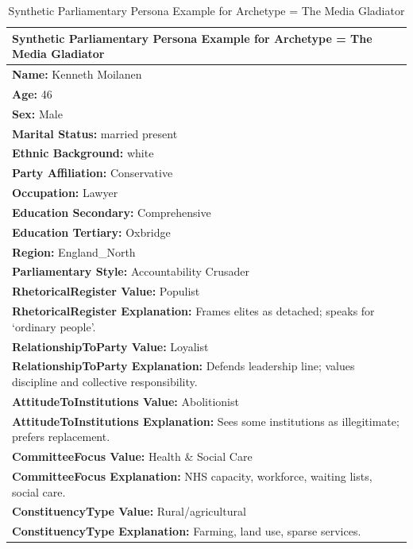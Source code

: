 \documentclass[11pt]{article}
\begin{document}
\begin{table}[ht]
\centering
\caption{Synthetic Parliamentary Persona Example for Archetype = The Media Gladiator}
\label{tab:parliamentry-persona-example-3}
\scriptsize %
\begin{tabularx}{\textwidth}{X}
\toprule
\textbf{Synthetic Parliamentary Persona Example for Archetype = The Media Gladiator} \\
\midrule
\textbf{Name:} Kenneth Moilanen \\
\textbf{Age:} 46 \\
\textbf{Sex:} Male \\
\textbf{Marital Status:} married present \\
\textbf{Ethnic Background:} white \\
\textbf{Party Affiliation:} Conservative \\
\textbf{Occupation:} Lawyer \\
\textbf{Education Secondary:} Comprehensive \\
\textbf{Education Tertiary:} Oxbridge \\
\textbf{Region:} England\_North \\
\textbf{Parliamentary Style:} Accountability Crusader \\[4pt]

\textbf{RhetoricalRegister Value:} Populist \\
\textbf{RhetoricalRegister Explanation:} Frames elites as detached; speaks for ‘ordinary people’. \\[4pt]

\textbf{RelationshipToParty Value:} Loyalist \\
\textbf{RelationshipToParty Explanation:} Defends leadership line; values discipline and collective responsibility. \\[4pt]

\textbf{AttitudeToInstitutions Value:} Abolitionist \\
\textbf{AttitudeToInstitutions Explanation:} Sees some institutions as illegitimate; prefers replacement. \\[4pt]

\textbf{CommitteeFocus Value:} Health \& Social Care \\
\textbf{CommitteeFocus Explanation:} NHS capacity, workforce, waiting lists, social care. \\[4pt]

\textbf{ConstituencyType Value:} Rural/agricultural \\
\textbf{ConstituencyType Explanation:} Farming, land use, sparse services. \\[4pt]


\end{tabularx}
\end{table}
\end{document}
